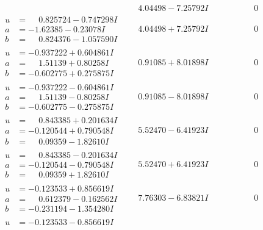 \documentclass[1p]{elsarticle_modified}
\theoremstyle{definition}
\begin{document}
$$\begin{array}{c|c|c}
 & \phantom{-}4.04498 - 7.25792 I & \phantom{-0.000000 } 0 \\ \hline\begin{aligned}
u &= \phantom{-}0.825724 - 0.747298 I \\
a &= -1.62385 - 0.23078 I \\
b &= \phantom{-}0.824376 - 1.057590 I\end{aligned}
 & \phantom{-}4.04498 + 7.25792 I & \phantom{-0.000000 } 0 \\ \hline\begin{aligned}
u &= -0.937222 + 0.604861 I \\
a &= \phantom{-}1.51139 + 0.80258 I \\
b &= -0.602775 + 0.275875 I\end{aligned}
 & \phantom{-}0.91085 + 8.01898 I & \phantom{-0.000000 } 0 \\ \hline\begin{aligned}
u &= -0.937222 - 0.604861 I \\
a &= \phantom{-}1.51139 - 0.80258 I \\
b &= -0.602775 - 0.275875 I\end{aligned}
 & \phantom{-}0.91085 - 8.01898 I & \phantom{-0.000000 } 0 \\ \hline\begin{aligned}
u &= \phantom{-}0.843385 + 0.201634 I \\
a &= -0.120544 + 0.790548 I \\
b &= \phantom{-}0.09359 - 1.82610 I\end{aligned}
 & \phantom{-}5.52470 - 6.41923 I & \phantom{-0.000000 } 0 \\ \hline\begin{aligned}
u &= \phantom{-}0.843385 - 0.201634 I \\
a &= -0.120544 - 0.790548 I \\
b &= \phantom{-}0.09359 + 1.82610 I\end{aligned}
 & \phantom{-}5.52470 + 6.41923 I & \phantom{-0.000000 } 0 \\ \hline\begin{aligned}
u &= -0.123533 + 0.856619 I \\
a &= \phantom{-}0.612379 - 0.162562 I \\
b &= -0.231194 - 1.354280 I\end{aligned}
 & \phantom{-}7.76303 - 6.83821 I & \phantom{-0.000000 } 0 \\ \hline\begin{aligned}
u &= -0.123533 - 0.856619 I \\

\end{aligned}
\end{array}$$
\end{document}
